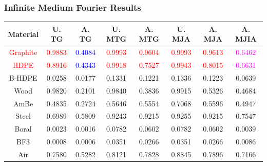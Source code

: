 \documentclass[compress,10pt]{beamer}
\newcommand{\tcr}[1]{\textcolor{red}{#1}}
\newcommand{\tcb}[1]{\textcolor{blue}{#1}}
\newcommand{\tcm}[1]{\textcolor{magenta}{#1}}
\begin{document}
\begin{frame}[t]\frametitle{Infinite Medium Fourier Results}{\small
\vspace{0.85cm}
\begin{table}
\centering
\def\arraystretch{1.2}
\begin{tabular}{|c||c|c||c|c||c|c|c|}
\hline
Material  & U. TG & A. TG & U. MTG & A. MTG & U. MJA & A. MJA & A. MJIA \\ \hline
\tcr{Graphite} & \tcr{0.9883}&\tcb{0.4084}&\tcr{0.9993}&\tcr{0.9604}&\tcr{0.9993}&\tcr{0.9613}&\tcm{0.6462}\\
\tcr{HDPE} &\tcr{0.8916}&\tcb{0.4343}&\tcr{0.9918}&\tcr{0.7527}&\tcr{0.9943}&\tcr{0.8015}&\tcm{0.6631}\\
B-HDPE &0.0258&0.0177&0.1331&0.1221&0.1336&0.1223&0.0639 \\
Wood & 0.9820&0.2101&0.9840&0.3836&0.9915&0.5326&0.4684 \\
AmBe  &0.4835&0.2724&0.5646&0.5554&0.7068&0.5596&0.4947 \\
Steel  & 0.6989&0.5809&0.9243&0.9215&0.9255&0.9215&0.7547\\
Boral  & 0.0023&0.0016&0.0782&0.0602&0.0782&0.0602&0.0039 \\
BF3   & 0.0008&0.0006&0.0351&0.0266&0.0351&0.0266&0.0086 \\
Air     &0.7580&0.5282&0.8121&0.7828&0.8845&0.7896&0.7166\\
\hline
\end{tabular}
\end{table}
}\end{frame}
\end{document}
